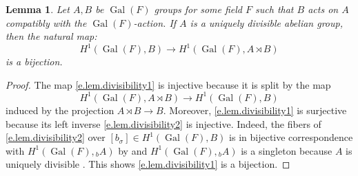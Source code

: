 \documentclass[12pt]{amsart}
\numberwithin{equation}{section}
\newtheorem{lemma}[theorem]{Lemma}
\theoremstyle{definition}
\newcommand{\Gal}{\operatorname{Gal}}
\begin{document}
\begin{lemma}\label{lem.divisible_semi_direct}
Let $A,B$ be $\Gal(F)$ groups for some field $F$ such that $B$ acts on $A$ compatibly with the $\Gal(F)$-action. If $A$ is a uniquely divisible abelian group, then the natural map:
\begin{equation}\label{e.lem.divisibility1}
H^1(\Gal(F),B) \to H^1(\Gal(F),A\rtimes B)
\end{equation}
is a bijection.
\end{lemma}
\begin{proof}
The map \eqref{e.lem.divisibility1} is injective because it is split by the map 
\begin{equation}\label{e.lem.divisibility2}
H^1(\Gal(F),A\rtimes B) \to H^1(\Gal(F),B)
\end{equation} 
induced by the projection $A\rtimes B\to B$. Moreover, \eqref{e.lem.divisibility1} is surjective because its left inverse \eqref{e.lem.divisibility2} is injective. Indeed, the fibers of \eqref{e.lem.divisibility2} over $[b_\sigma]\in H^1(\Gal(F),B)$ is in bijective correspondence with $H^1(\Gal(F),{}_b A)$ by \cite[Page 52, Corollary 2]{serre1997galois} and $H^1(\Gal(F),{}_b A)$ is a singleton because $A$ is uniquely divisible \cite[Corollary 4.2.7]{gille_szamuely_2006}. This shows \eqref{e.lem.divisibility1} is a bijection.
\end{proof}
\end{document}
